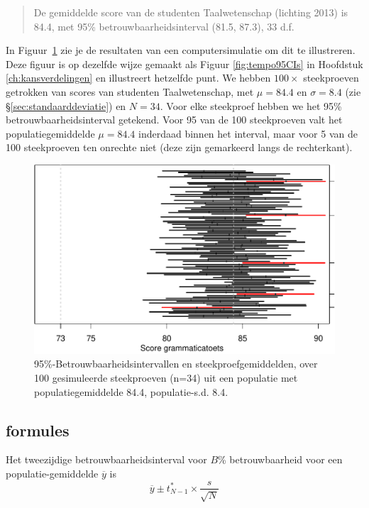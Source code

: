 \documentclass[
]{book}
\begin{document}
\begin{quote}
De gemiddelde score van de studenten Taalwetenschap (lichting 2013) is
84.4, met 95\% betrouwbaarheidsinterval (81.5, 87.3), 33 d.f.
\end{quote}

In Figuur~\ref{fig:gramm2013CIs} zie je de resultaten van een
computersimulatie om dit te illustreren. Deze figuur is op dezelfde wijze gemaakt als Figuur \ref{fig:tempo95CIs} in Hoofdstuk \ref{ch:kansverdelingen} en illustreert hetzelfde punt.
We hebben \(100\times\)
steekproeven getrokken van scores van studenten Taalwetenschap, met
\(\mu=84.4\) en \(\sigma=8.4\) (zie
§\ref{sec:standaarddeviatie}) en \(N=34\). Voor elke steekproef
hebben we het 95\% betrouwbaarheidsinterval getekend. Voor 95 van de 100
steekproeven valt het populatiegemiddelde \(\mu=84.4\) inderdaad binnen
het interval, maar voor 5 van de 100 steekproeven ten onrechte niet
(deze zijn gemarkeerd langs de rechterkant).

\begin{figure}
\centering
\includegraphics{KMS-NL_files/figure-latex/gramm2013CIs-1.pdf}
\caption{\label{fig:gramm2013CIs}95\%-Betrouwbaarheidsintervallen en steekproefgemiddelden, over 100 gesimuleerde steekproeven (n=34) uit een populatie met populatiegemiddelde 84.4, populatie-s.d. 8.4.}
\end{figure}

\hypertarget{sec:formules13-2}{%
\subsection{formules}\label{sec:formules13-2}}

Het tweezijdige betrouwbaarheidsinterval voor \(B\)\% betrouwbaarheid voor
een populatie-gemiddelde \(\overline{y}\) is
\begin{equation}
    \overline{y} \pm t^*_{N-1} \times \frac{s}{\sqrt{N}}
  \label{eq:t-onesampleCI}
\end{equation}
\end{document}
